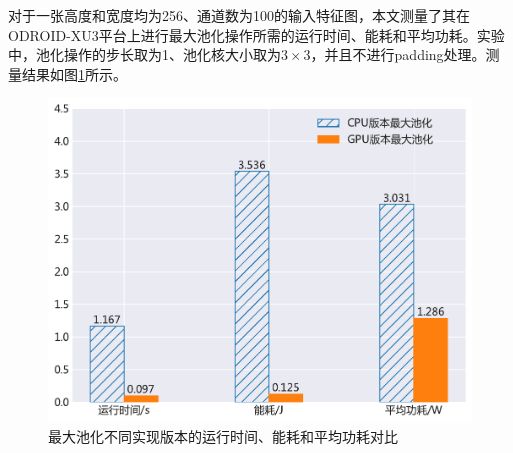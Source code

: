 
对于一张高度和宽度均为256、通道数为100的输入特征图，本文测量了其在ODROID-XU3平台上进行最大池化操作所需的运行时间、能耗和平均功耗。实验中，池化操作的步长取为1、池化核大小取为$3 \times 3$，并且不进行padding处理。测量结果如图\ref{figure:figure12}所示。

\begin{figure}[htb]
    \begin{center}
    \includegraphics[height=0.4\textwidth]{figures/pool_energy.pdf}
    \end{center}
    \caption{最大池化不同实现版本的运行时间、能耗和平均功耗对比}\label{figure:figure12}
\end{figure}

